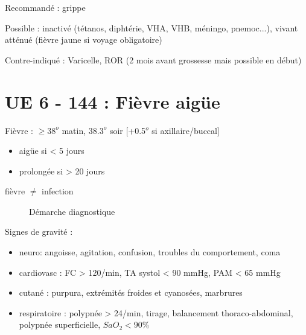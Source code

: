 \documentclass{article}
\newcommand*{\TakeFourierOrnament}[1]{{%
\fontencoding{U}\fontfamily{futs}\selectfont\char#1}}
\newcommand*{\danger}{\TakeFourierOrnament{66}}
\begin{document}
Recommandé : grippe

Possible : inactivé (tétanos, diphtérie, VHA, VHB, méningo, pnemoc...), vivant
atténué (fièvre jaune si voyage obligatoire)

Contre-indiqué : Varicelle, ROR (2 mois avant grossesse mais possible en début)
\section{UE 6 - 144 : Fièvre aigüe}

Fièvre : \(\ge 38^{o}\) matin, \(38.3^{o}\) soir [+0.5$^{o}$ si axillaire/buccal]
\begin{itemize}
\item aigüe si \textless{} 5 jours
\item prolongée si \textgreater{} 20 jours
\end{itemize}

\danger fièvre \(\neq\) infection

\begin{figure}[htpb]
  \centering
  \caption{Démarche diagnostique}
\end{figure}

Signes de gravité :

\begin{itemize}
\item
  neuro: angoisse, agitation, confusion, troubles du comportement, coma
\item
  cardiovasc : FC > 120/min, TA systol < 90 mmHg,
  PAM < 65 mmHg
\item
  cutané : purpura, extrémités froides et cyanosées, marbrures
\item
  respiratoire : polypnée > 24/min, tirage, balancement
  thoraco-abdominal, polypnée superficielle, \(SaO_2 < 90 \%\)
\end{itemize}
\end{document}
